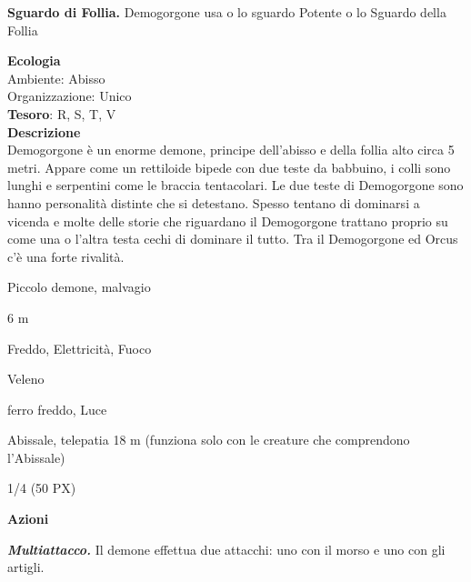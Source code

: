 \begin{multicols}{2}
{\textbf{Sguardo di Follia.} Demogorgone usa o lo sguardo Potente o lo Sguardo della Follia

\textbf{Ecologia}\\
Ambiente: Abisso\\
Organizzazione: Unico\\
\textbf{Tesoro}: R, S, T, V\\
\textbf{Descrizione}\\
Demogorgone è un enorme demone, principe dell'abisso e della follia alto circa 5 metri. Appare come un rettiloide bipede con due teste da babbuino, i colli sono lunghi e serpentini come le braccia tentacolari. Le due teste di Demogorgone sono hanno personalità distinte che si detestano. Spesso tentano di dominarsi a vicenda e molte delle storie che riguardano il Demogorgone trattano proprio su come una o l'altra testa cechi di dominare il tutto. Tra il Demogorgone ed Orcus c'è una forte rivalità.



\begin{description}[noitemsep, topsep=0pt, parsep=0pt, partopsep=0pt, itemsep=1pt, leftmargin=2.35cm,  labelwidth=2.2cm, itemindent=0cm, listparindent=0pt] %
\setlength{\baselineskip}{10pt}
\item[\textbf{Taglia/Tipo}] Piccolo demone, malvagio
\item[\textbf{Caratt.}] 
\item[\textbf{Punti Ferita}] 
\item[\textbf{Movimento}] 6 m
\item[\textbf{Tiri Salvez.}] 
\item[\textbf{Res. Danni}] Freddo, Elettricità, Fuoco
\item[\textbf{Imm. Danni}] Veleno
\item[\textbf{Vulnerabilità}] ferro freddo, Luce
\item[\textbf{Sensi}] 
\item[\textbf{Linguaggi}] Abissale, telepatia 18 m (funziona solo con le creature che comprendono l'Abissale)
\item[\textbf{Sfida}] 1/4 (50 PX)
\end{description}
\smallskip

\textbf{Azioni}

\emph{\textbf{Multiattacco.}} Il demone effettua due attacchi: uno con il morso e uno con gli artigli.

}
\end{multicols}
